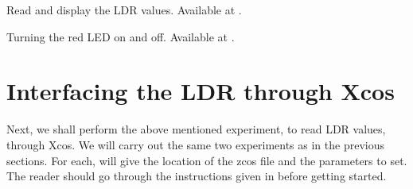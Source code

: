 \begin{scicode}
{Read and display the LDR values.  Available at
  .}
\label{sci:ldr-read}

\end{scicode}

\begin{scicode}
{Turning the red LED on and off.  Available at
  .}
\label{sci:ldr-led}

\end{scicode}

\section{Interfacing the LDR through Xcos}
Next, we shall perform the above mentioned experiment, to read LDR
values, through Xcos.  We will carry out the same two experiments as in the previous
sections.  For each, will give the location
of the zcos file and the parameters to set.  The reader should go
through the instructions given in  before
getting started.

